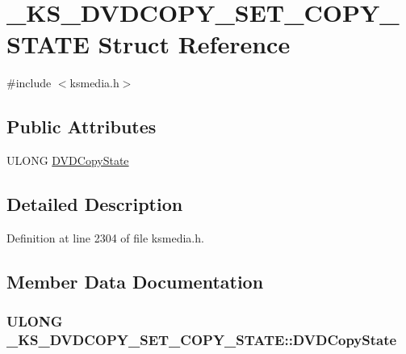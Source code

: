 \hypertarget{struct___k_s___d_v_d_c_o_p_y___s_e_t___c_o_p_y___s_t_a_t_e}{}\section{\+\_\+\+K\+S\+\_\+\+D\+V\+D\+C\+O\+P\+Y\+\_\+\+S\+E\+T\+\_\+\+C\+O\+P\+Y\+\_\+\+S\+T\+A\+TE Struct Reference}
\label{struct___k_s___d_v_d_c_o_p_y___s_e_t___c_o_p_y___s_t_a_t_e}


{\ttfamily \#include $<$ksmedia.\+h$>$}

\subsection*{Public Attributes}
\begin{DoxyCompactItemize}
\item 
U\+L\+O\+NG \hyperlink{struct___k_s___d_v_d_c_o_p_y___s_e_t___c_o_p_y___s_t_a_t_e_a04acebd89f147b7d24594a8cd4ca90fb}{D\+V\+D\+Copy\+State}
\end{DoxyCompactItemize}


\subsection{Detailed Description}


Definition at line 2304 of file ksmedia.\+h.



\subsection{Member Data Documentation}
\subsubsection[{\texorpdfstring{D\+V\+D\+Copy\+State}{DVDCopyState}}]{\setlength{\rightskip}{0pt plus 5cm}U\+L\+O\+NG \+\_\+\+K\+S\+\_\+\+D\+V\+D\+C\+O\+P\+Y\+\_\+\+S\+E\+T\+\_\+\+C\+O\+P\+Y\+\_\+\+S\+T\+A\+T\+E\+::\+D\+V\+D\+Copy\+State}\hypertarget{struct___k_s___d_v_d_c_o_p_y___s_e_t___c_o_p_y___s_t_a_t_e_a04acebd89f147b7d24594a8cd4ca90fb}{}\label{struct___k_s___d_v_d_c_o_p_y___s_e_t___c_o_p_y___s_t_a_t_e_a04acebd89f147b7d24594a8cd4ca90fb}



